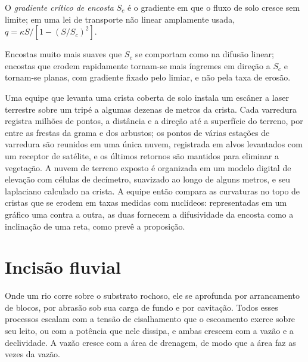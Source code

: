 \begin{definition}\label{def:b3:quantitative-geomorphology:critical}
O \emph{gradiente crítico de encosta}
$S_c$ é o gradiente em que o fluxo de solo cresce sem limite; em uma
lei de transporte não linear amplamente usada, $q = \kappa S/[1 - (S/S_c)^2]$.
\end{definition}

Encostas muito mais suaves que $S_c$ se comportam como na difusão linear; encostas que
erodem rapidamente tornam-se mais íngremes em direção a $S_c$ e tornam-se planas, com gradiente fixado pelo
limiar, e não pela taxa de erosão.

\begin{inthefield}
Uma equipe que levanta uma crista coberta de solo instala um escâner a laser terrestre sobre um
tripé a algumas dezenas de metros da crista. Cada varredura registra milhões de
pontos, a distância e a direção até a superfície do terreno, por entre as frestas
da grama e dos arbustos; os pontos de várias estações de varredura são reunidos
em uma única nuvem, registrada em alvos levantados com um receptor de satélite,
e os últimos retornos são mantidos para eliminar a vegetação. A nuvem de terreno exposto
é organizada em um modelo digital de elevação com células de decímetro, suavizado ao longo de alguns
metros, e seu laplaciano calculado na crista. A equipe então compara as
curvaturas no topo de cristas que se erodem em taxas medidas com 
nuclídeos: representadas em um gráfico uma contra a outra, as duas fornecem a difusividade da
encosta como a inclinação de uma reta, como prevê a proposição.
\end{inthefield}

\section{Incisão fluvial}\label{sec:b3:quantitative-geomorphology:rivers}

Onde um rio corre sobre o substrato rochoso, ele se aprofunda por arrancamento de blocos, por abrasão
sob sua carga de fundo e por cavitação. Todos esses processos escalam com a tensão de cisalhamento
que o escoamento exerce sobre seu leito, ou com a potência que nele dissipa, e ambas crescem
com a vazão e a declividade. A vazão cresce com a área de drenagem, de modo que a área faz as vezes da
vazão.

